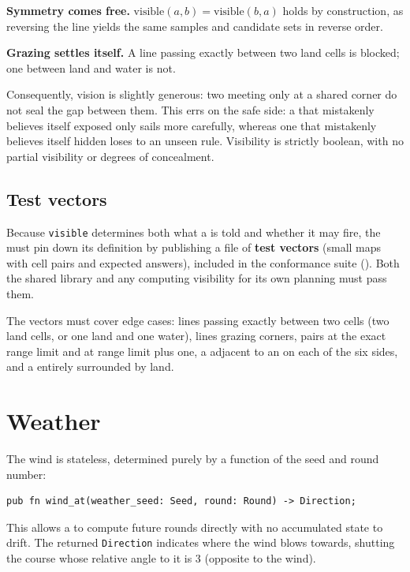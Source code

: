 \documentclass{article}
\begin{document}
\textbf{Symmetry comes free.} $\mathrm{visible}(a,b) = \mathrm{visible}(b,a)$ holds by
construction, as reversing the line yields the same samples and candidate sets in reverse order.

\textbf{Grazing settles itself.} A line passing exactly between two land cells is blocked; one
between land and water is not.

Consequently, vision is slightly generous: two \islands{} meeting only at a shared corner do not
seal the gap between them. This errs on the safe side: a \ship{} that mistakenly believes itself
exposed only sails more carefully, whereas one that mistakenly believes itself hidden loses to an
unseen rule. Visibility is strictly boolean, with no partial visibility or degrees of concealment.

\subsection{Test vectors}
\label{proto:vectors}

Because \texttt{visible} determines both what a \ship{} is told and whether it may fire, the \WG{}
must pin down its definition by publishing a file of \textbf{test vectors} (small maps with cell
pairs and expected answers), included in the conformance suite (\OD). Both the shared library and
any \ship{} computing visibility for its own planning must pass them.

The vectors must cover edge cases: lines passing exactly between two cells (two land cells, or one
land and one water), lines grazing corners, pairs at the exact range limit and at range limit plus
one, a \ship{} adjacent to an \island{} on each of the six sides, and a \ship{} entirely surrounded
by land.

\newpage
\section{Weather}
\label{proto:weather}

The wind is stateless, determined purely by a function of the seed and round number:

\begin{lstlisting}
pub fn wind_at(weather_seed: Seed, round: Round) -> Direction;
\end{lstlisting}

This allows a \ship{} to compute future rounds directly with no accumulated state to drift.
The returned \texttt{Direction} indicates where the wind blows towards, shutting the course whose
relative angle to it is $3$ (opposite to the wind).
\end{document}
